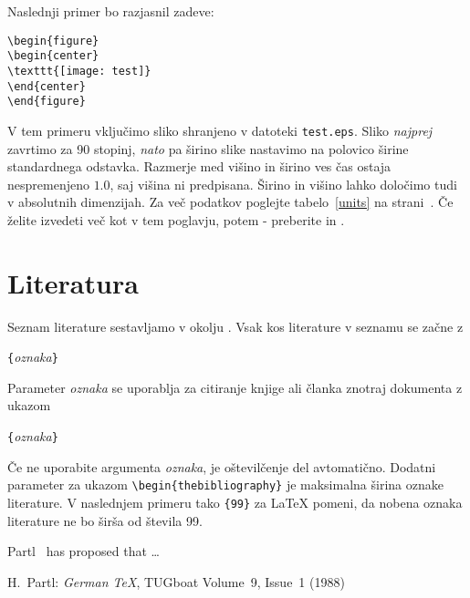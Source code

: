 Naslednji primer bo razjasnil zadeve:
\begin{code}
\begin{verbatim}
\begin{figure}
\begin{center}
\texttt{[image: test]}
\end{center}
\end{figure}
\end{verbatim}
\end{code}
V tem primeru vključimo sliko shranjeno v datoteki \texttt{test.eps}. Sliko \emph{najprej} zavrtimo
za 90 stopinj, \emph{nato} pa širino slike nastavimo na polovico širine standardnega odstavka.
Razmerje med višino in širino ves čas ostaja nespremenjeno $1.0$, saj višina ni predpisana.  
Širino in višino lahko določimo tudi v absolutnih dimenzijah. Za več podatkov poglejte tabelo~\ref{units} na
strani~\pageref{units}. Če želite izvedeti več kot v tem poglavju, potem - 
preberite \cite{graphics} in \cite{eps}.

\section{Literatura}
 
Seznam literature sestavljamo v okolju .
Vsak kos literature v seznamu se začne z
\begin{lscommand}
\verb|{|\emph{oznaka}\verb|}|
\end{lscommand}
Parameter \emph{oznaka} se uporablja za citiranje knjige ali članka znotraj dokumenta z ukazom 
\begin{lscommand}
\verb|{|\emph{oznaka}\verb|}|
\end{lscommand}
Če ne uporabite argumenta \emph{oznaka}, je oštevilčenje del
avtomatično. Dodatni parameter za 
ukazom \verb|\begin{thebibliography}| je maksimalna širina oznake literature. V naslednjem primeru tako \verb|{99}| 
za \LaTeX{} pomeni, da nobena oznaka literature ne bo širša od števila 99.
\enlargethispage{2cm}
\begin{example}
Partl~\cite{pa} has 
proposed that \ldots 
\begin{thebibliography}{99}
 H.~Partl: 
\emph{German \TeX},
TUGboat Volume~9, Issue~1 (1988)
\end{thebibliography}
\end{example}

\thispagestyle{fancyplain}

